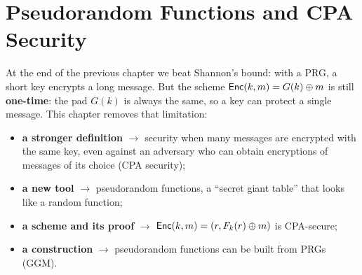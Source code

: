 \chapter{Pseudorandom Functions and CPA Security}\label{ch:prf-cpa}

At the end of the previous chapter we beat Shannon's bound: with a PRG, a short key encrypts a long message. But the scheme $\mathsf{Enc}(k, m) = G(k) \oplus m$ is still \textbf{one-time}: the pad $G(k)$ is always the same, so a key can protect a single message. This chapter removes that limitation:
\begin{itemize}
  \item \textbf{a stronger definition} $\to$ security when many messages are encrypted with the same key, even against an adversary who can obtain encryptions of messages of its choice (CPA security);
  \item \textbf{a new tool} $\to$ pseudorandom functions, a ``secret giant table'' that looks like a random function;
  \item \textbf{a scheme and its proof} $\to$ $\mathsf{Enc}(k, m) = (r, F_k(r) \oplus m)$ is CPA-secure;
  \item \textbf{a construction} $\to$ pseudorandom functions can be built from PRGs (GGM).
\end{itemize}





